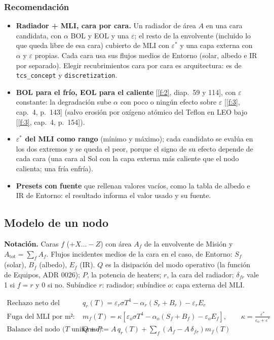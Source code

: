 \documentclass[11pt,a4paper]{article}
\newcommand{\code}[1]{\texttt{#1}}
\newcommand{\f}[1]{\ref{f:#1}}
\begin{document}
\subsubsection*{Recomendación}

\begin{itemize}
  \item \textbf{Radiador + MLI, cara por cara.} Un radiador de área $A$ en una cara candidata, con $\alpha$ BOL y EOL y una $\varepsilon$; el resto de la envolvente (incluido lo que queda libre de esa cara) cubierto de MLI con $\varepsilon^*$ y una capa externa con $\alpha$ y $\varepsilon$ propias. Cada cara usa sus flujos medios de Entorno (solar, albedo e IR por separado). Elegir recubrimientos cara por cara es arquitectura: es de \code{tcs\_concept} y \code{discretization}.
  \item \textbf{BOL para el frío, EOL para el caliente} [\f{2}, diap.~59 y 114], con $\varepsilon$ constante: la degradación sube $\alpha$ con poco o ningún efecto sobre $\varepsilon$ [\f{3}, cap.~4, p.~143] (salvo erosión por oxígeno atómico del Teflon en LEO bajo [\f{3}, cap.~4, p.~154]).
  \item \textbf{$\varepsilon^*$ del MLI como rango} (mínimo y máximo); cada candidato se evalúa en los dos extremos y se queda el peor, porque el signo de su efecto depende de cada cara (una cara al Sol con la capa externa más caliente que el nodo calienta; una fría enfría).
  \item \textbf{Presets con fuente} que rellenan valores vacíos, como la tabla de albedo e IR de Entorno: el resultado informa el valor usado y su fuente.
\end{itemize}

\subsection{Modelo de un nodo}\label{sec:nodo}

\textbf{Notación.} Caras $f$ ($+X \ldots -Z$) con área $A_f$ de la envolvente de Misión y $A_\mathrm{tot} = \sum_f A_f$. Flujos incidentes medios de la cara en el caso, de Entorno: $S_f$ (solar), $B_f$ (albedo), $E_f$ (IR). $Q$ es la disipación del modo operativo (la función de Equipos, ADR 0026); $P$, la potencia de heaters; $r$, la cara del radiador; $\delta_{fr}$ vale 1 si $f = r$ y 0 si no. Subíndice $r$: radiador; subíndice $o$: capa externa del MLI.

\begin{align*}
  \text{Rechazo neto del radiador por m²:} \quad & q_r(T) = \varepsilon_r \sigma T^4 - \alpha_r (S_r + B_r) - \varepsilon_r E_r \\[4pt]
  \text{Fuga del MLI por m²:} \quad & m_f(T) = \kappa \left[ \varepsilon_o \sigma T^4 - \alpha_o (S_f + B_f) - \varepsilon_o E_f \right],
    \qquad \kappa = \frac{\varepsilon^*}{\varepsilon_o + \varepsilon^*} \\[4pt]
  \text{Balance del nodo ($T$ uniforme):} \quad & Q + P = A\, q_r(T) + \sum_f \left( A_f - A\,\delta_{fr} \right) m_f(T)
\end{align*}
\end{document}
